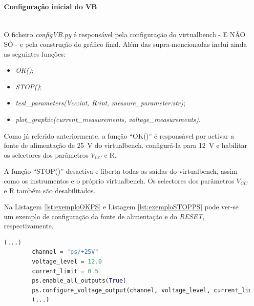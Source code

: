 
\paragraph{Configuração inicial do VB} ~\\

O ficheiro \textit{configVB.py} é responsável pela configuração do \acrshort{virtualbench} - E NÃO SÓ - e pela construção do gráfico final. Além das supra-mencionadas inclui ainda as seguintes funções:
\begin{itemize}
	\item \textit{OK()};
	\item \textit{STOP()};
	\item \textit{test\_parameters(Vcc:int, R:int, measure\_parameter:str)};
	\item \textit{plot\_graphic(current\_measurements, voltage\_measurements)}.
\end{itemize}

Como já referido anteriormente, a função ``OK()'' é responsável por activar a fonte de alimentação de \SI{25}{\volt} do \acrshort{virtualbench}, configurá-la para \SI{12}{\volt} e habilitar os selectores dos parâmetros $V_{CC}$ e R. 


A função ``STOP()'' desactiva e liberta todas as saídas do \acrshort{virtualbench}, assim como os instrumentos e o próprio \acrshort{virtualbench}. Os selectores dos parâmetros $V_{CC}$ e R também são desabilitados.

Na Listagem \ref{lst:exemploOKPS} e Listagem \ref{lst:exemploSTOPPS} pode ver-se um exemplo de configuração da fonte de alimentação e do \textit{RESET}, respectivamente. 

\begin{minipage}{0.9\linewidth}
	\begin{lstlisting}[language=python, escapechar=|, caption=Exemplo de configuração: fonte de alimentação - OK, label=lst:exemploOKPS]
		(...)
		channel = "ps/+25V"
		voltage_level = 12.0
		current_limit = 0.5 
		ps.enable_all_outputs(True)
		ps.configure_voltage_output(channel, voltage_level, current_limit)
		(...)
	\end{lstlisting}
\end{minipage}

